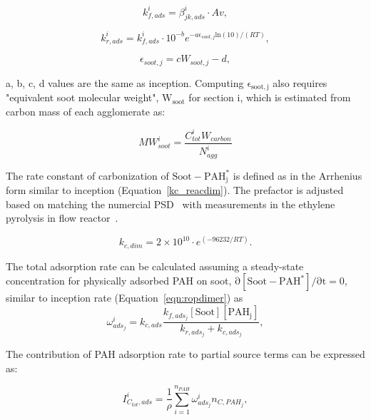 \begin{equation}
	k^i_{f,ads}=\beta^i_{jk,ads}\cdot Av
	\label{eqn:kfads_reacdim},
\end{equation}

\begin{equation}
	k^i_{r,ads}=k^i_{f,ads}\cdot10^{-b}e^{-a\epsilon_{soot,j} \mathrm{ln}(10)/(RT)}
	\label{eqn:krads_reacdim},
\end{equation}

\begin{equation}
	\epsilon_{soot,j} = cW_{soot,j} -d
	\label{eqn:epsilonads_reacdim},
\end{equation}

a, b, c, d values are the same as inception. Computing $\mathrm{\epsilon_{soot,j}}$ also requires "equivalent soot molecular weight", $\mathrm{W_{soot}}$ for section i, which is estimated from carbon mass of each agglomerate as:

\begin{equation}
	MW^i_{soot}=\frac{C^i_{tot}W_{carbon}}{N^i_{agg}} 
\end{equation}

The rate constant of carbonization of $\mathrm{Soot-PAH^*_j}$ is defined as in the Arrhenius form similar to inception (Equation~\eqref{kc_reacdim}). The prefactor is adjusted based on matching the numercial PSD~\citep{naseri2022simulating} with measurements in the ethylene pyrolysis in flow reactor~\cite{araki2021effects}. 

\begin{equation}
	k_{c,dim} = 2\times10^{10}\cdot e^{(-96232/RT)}
	\label{eqn:kcads_reacdim}.
\end{equation}


The total adsorption rate can be calculated assuming a steady-state concentration for physically adsorbed PAH on soot, $\mathrm{\partial{[{Soot-PAH^*}]}/\partial t = 0}$, similar to inception rate (Equation~\eqref{eqn:ropdimer}) as\\

\begin{equation}
	\omega^i_{ads_j} = k_{c,ads}\frac{k_{f,ads_j}[\mathrm{Soot}][\mathrm{PAH_j}]}{k_{r,ads_j}+k_{c,ads_j}}
	\label{eqn:wads_reacdim},
\end{equation}

The contribution of PAH adsorption rate to partial source terms can be expressed as:

\begin{equation}
	I^i_{C_{tot},ads} =
	\frac{1}{\rho}
	\sum_{i=1}^{n_{PAH}}
	\omega^i_{ads_j}
	n_{C,PAH_j}
	\label{eqn:ICtotads_reacdim},
\end{equation}

